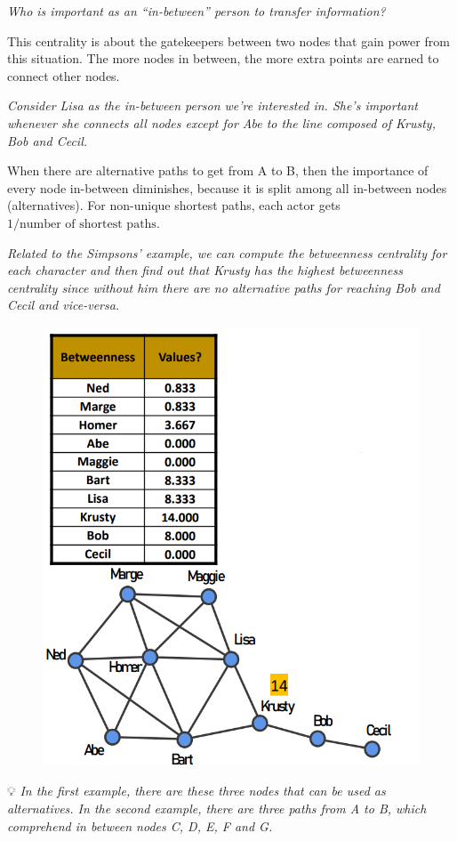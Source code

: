\documentclass[
  notitlepage,
  onecolumn,
  openany]{book}
\begin{document}
\emph{Who is important as an ``in-between'' person to transfer information?}

This centrality is about the gatekeepers between two nodes that gain power from this situation. The more nodes in between, the more extra points are earned to connect other nodes.

\emph{Consider Lisa as the in-between person we're interested in. She's important whenever she connects all nodes except for Abe to the line composed of Krusty, Bob and Cecil.}

When there are alternative paths to get from A to B, then the importance of every node in-between diminishes, because it is split among all in-between nodes (alternatives). For non-unique shortest paths, each actor gets \(1/\text{number of shortest paths}\).

\emph{Related to the Simpsons' example, we can compute the betweenness centrality for each character and then find out that Krusty has the highest betweenness centrality since without him there are no alternative paths for reaching Bob and Cecil and vice-versa.}

\begin{figure}[h!]

{\centering \includegraphics[width=0.5\linewidth]{images/04-Centrality/Untitled 5} 

}

\end{figure}

💡 \emph{In the first example, there are these three nodes that can be used as alternatives. In the second example, there are three paths from A to B, which comprehend in between nodes C, D, E, F and G.}
\end{document}
